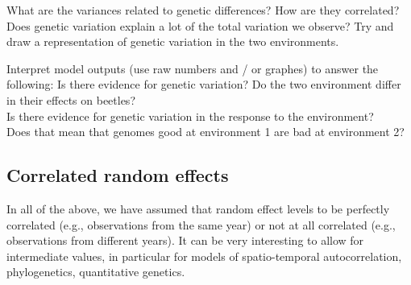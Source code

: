 \documentclass[12pt,a4paper]{scrartcl}\usepackage[]{graphicx}\usepackage[]{color}
\begin{document}
\begin{Exercise}[difficulty=2, title={Beetles: look at the model}]
What are the variances related to genetic differences? How are they correlated? Does genetic variation explain a lot of the total variation we observe? Try and draw a representation of genetic variation in the two environments. 
\end{Exercise}

\begin{Exercise}[difficulty=3, title={Beetles: interpret}]
Interpret model outputs (use raw numbers and / or graphes) to answer the following:
Is there evidence for genetic variation? Do the two environment differ in their effects on beetles? \\
Is there evidence for genetic variation in the response to the environment? \\
Does that mean that genomes good at environment 1 are bad at environment 2?
\end{Exercise}

\subsection{Correlated random effects}
In all of the above, we have assumed that random effect levels to be perfectly correlated (e.g., observations from the same year) or not at all correlated (e.g., observations from different years). It can be very interesting to allow for intermediate values, in particular for models of spatio-temporal autocorrelation, phylogenetics, quantitative genetics.
\end{document}
